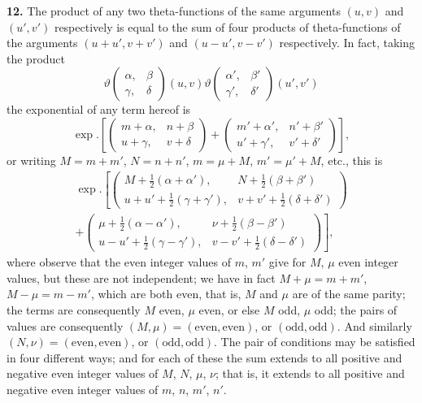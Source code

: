 \documentclass[11pt,a4paper]{book}
\begin{document}
\noindent\textbf{12.}\quad
The product of any two theta-functions of the same arguments $(u, v)$ and $(u', v')$ respectively is equal to the sum of four products of theta-functions of the arguments $(u + u', v + v')$ and $(u - u', v - v')$ respectively. In fact, taking the product
\[
\vartheta\begin{pmatrix} \alpha, & \beta \\ \gamma, & \delta \end{pmatrix}(u, v)
\vartheta\begin{pmatrix} \alpha', & \beta' \\ \gamma', & \delta' \end{pmatrix}(u', v')
\]
the exponential of any term hereof is
\[
\exp.\left[\begin{pmatrix} m + \alpha, & n + \beta \\ u + \gamma, & v + \delta \end{pmatrix} + \begin{pmatrix} m' + \alpha', & n' + \beta' \\ u' + \gamma', & v' + \delta' \end{pmatrix}\right],
\]
or writing $M = m + m'$, $N = n + n'$, $m = \mu + M$, $m' = \mu' + M$, etc., this is
\begin{multline*}
\exp.\left[\begin{pmatrix} M + \tfrac{1}{2}(\alpha + \alpha'), & N + \tfrac{1}{2}(\beta + \beta') \\ u + u' + \tfrac{1}{2}(\gamma + \gamma'), & v + v' + \tfrac{1}{2}(\delta + \delta') \end{pmatrix}\right. \\
+ \left.\begin{pmatrix} \mu + \tfrac{1}{2}(\alpha - \alpha'), & \nu + \tfrac{1}{2}(\beta - \beta') \\ u - u' + \tfrac{1}{2}(\gamma - \gamma'), & v - v' + \tfrac{1}{2}(\delta - \delta') \end{pmatrix}\right],
\end{multline*}
where observe that the even integer values of $m$, $m'$ give for $M$, $\mu$ even integer values, but these are not independent; we have in fact $M + \mu = m + m'$, $M - \mu = m - m'$, which are both even, that is, $M$ and $\mu$ are of the same parity; the terms are consequently $M$ even, $\mu$ even, or else $M$ odd, $\mu$ odd; the pairs of values are consequently $(M, \mu) = (\text{even}, \text{even})$, or $(\text{odd}, \text{odd})$. And similarly $(N, \nu) = (\text{even}, \text{even})$, or $(\text{odd}, \text{odd})$. The pair of conditions may be satisfied in four different ways; and for each of these the sum extends to all positive and negative even integer values of $M$, $N$, $\mu$, $\nu$; that is, it extends to all positive and negative even integer values of $m$, $n$, $m'$, $n'$.
\end{document}
